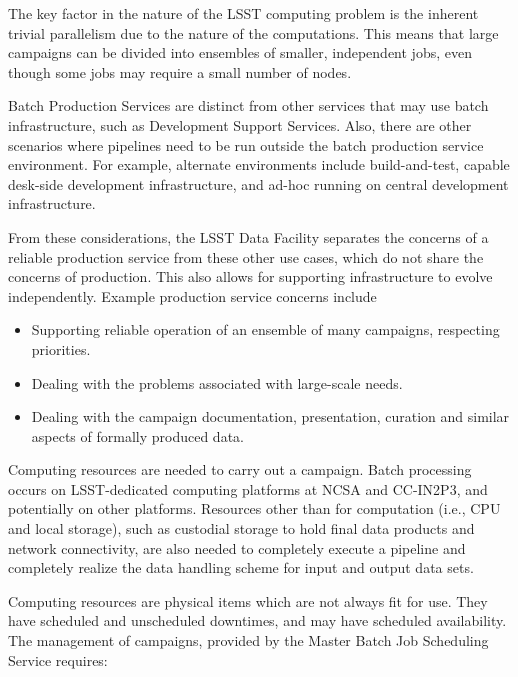 The key factor in the nature of the LSST computing problem is the inherent
trivial parallelism due to the nature of the computations. This means that large
campaigns can be divided into ensembles of smaller, independent jobs, even
though some jobs may require a small number of nodes.

Batch Production Services are distinct from other services that may use batch
infrastructure, such as Development Support Services. Also, there are other
scenarios where pipelines need to be run outside the batch production service
environment.  For example, alternate environments include build-and-test,
capable desk-side development infrastructure, and ad-hoc running on central
development infrastructure.

From these considerations, the LSST Data Facility separates the concerns of a
reliable production service from these other use cases, which do not share the
concerns of production. This also allows for supporting infrastructure to evolve
independently. Example production service concerns include

\begin{itemize}

\item Supporting reliable operation of an ensemble of many campaigns, respecting
priorities.

\item Dealing with the problems associated with large-scale needs.

\item Dealing with the campaign documentation, presentation, curation and similar
aspects of formally produced data.

\end{itemize}

Computing resources are needed to carry out a campaign. Batch processing occurs
on LSST-dedicated computing platforms at NCSA and CC-IN2P3, and potentially on
other platforms. Resources other than for computation (i.e., CPU and local
storage), such as custodial storage to hold final data products and network
connectivity, are also needed to completely execute a pipeline and completely
realize the data handling scheme for input and output data sets.

Computing resources are physical items which are not always fit for use. They
have scheduled and unscheduled downtimes, and may have scheduled availability.
The management of campaigns, provided by the Master Batch Job Scheduling Service
requires:

